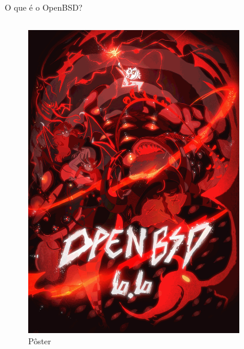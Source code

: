 \documentclass[9pt,xcolor=table]{beamer}
\begin{document}
\begin{frame}{O que é o OpenBSD?}
\begin{columns}
\begin{column}{0.3\textwidth}
\begin{figure}
            \includegraphics[width=\textwidth]{imagens/banner-openbsd.png}
            \caption{Pôster}
            \end{figure}
        \end{column}
        \begin{column}{0.3\textwidth}
            \begin{figure}
            \centering

\end{figure}
\end{column}
\end{columns}
\end{frame}
\end{document}
